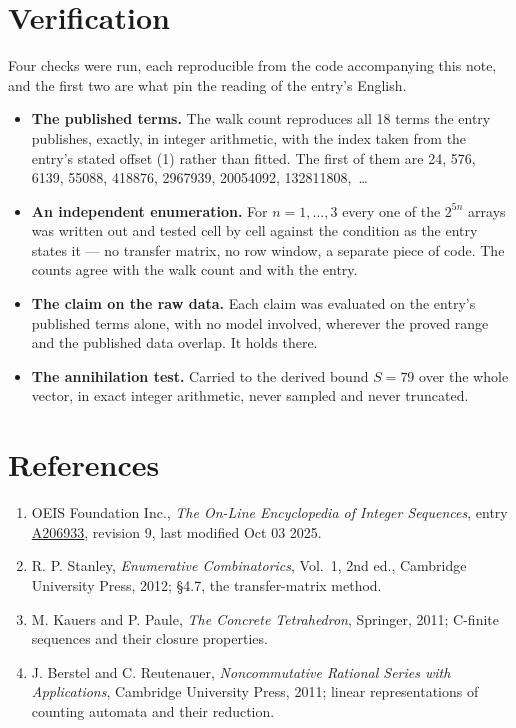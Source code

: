 \documentclass[11pt]{article}
\theoremstyle{definition}
\begin{document}
\section{Verification}

Four checks were run, each reproducible from the code accompanying this note, and the first two are what pin the reading of the entry's English.

\begin{itemize}

\item {\bfseries The published terms.} The walk count reproduces all 18 terms the entry publishes, exactly, in integer arithmetic, with the index taken from the entry's stated offset (1) rather than fitted. The first of them are 24, 576, 6139, 55088, 418876, 2967939, 20054092, 132811808,~\dots

\item {\bfseries An independent enumeration.} For $n = 1,\dots,3$ every one of the $2^{5n}$ arrays was written out and tested cell by cell against the condition as the entry states it --- no transfer matrix, no row window, a separate piece of code. The counts agree with the walk count and with the entry.

\item {\bfseries The claim on the raw data.} Each claim was evaluated on the entry's published terms alone, with no model involved, wherever the proved range and the published data overlap. It holds there.

\item {\bfseries The annihilation test.} Carried to the derived bound $S = 79$ over the whole vector, in exact integer arithmetic, never sampled and never truncated.

\end{itemize}

\section{References}

\begin{enumerate}

\item OEIS Foundation Inc., \emph{The On-Line Encyclopedia of Integer Sequences}, entry \href{https://oeis.org/A206933}{A206933}, revision 9, last modified Oct 03 2025.

\item R. P. Stanley, \emph{Enumerative Combinatorics}, Vol.~1, 2nd ed., Cambridge University Press, 2012; \S4.7, the transfer-matrix method.

\item M. Kauers and P. Paule, \emph{The Concrete Tetrahedron}, Springer, 2011; C-finite sequences and their closure properties.

\item J. Berstel and C. Reutenauer, \emph{Noncommutative Rational Series with Applications}, Cambridge University Press, 2011; linear representations of counting automata and their reduction.

\end{enumerate}
\end{document}
